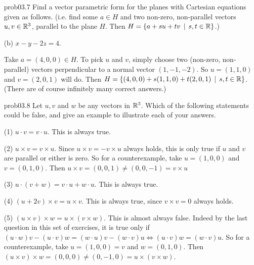  \begin{sol}{prob03.7} Find a vector parametric form  for  the planes with Cartesian equations given as follows. (i.e. find some $a \in H$ and two non-zero, non-parallel vectors $u, v \in \mathbb{R}^3$, parallel to the plane $H$. Then  $H=\{a+ s u + t v\,\mid \, s,t \in \mathbb{R} \}$.)\medskip

(b)  $x - y - 2z = 4$. 

\soln Take $a=(4,0,0) \in H$. To pick $u$ and $v$, simply choose two (non-zero, non-parallel) vectors perpendicular to a normal vector $(1,-1,-2)$. So  $u= (1,1,0)$  and $v=(2,0,1)$ will do. Then $H=\{(4,0,0)+ s (1,1,0) + t (2,0,1)\,\mid \, s,t \in \mathbb{R} \}$. (There are of course infinitely many correct answers.)\medskip


\end{sol} 

\begin{sol}{prob03.8}  Let $u, v$ and $w$ be any vectors in $\mathbb{R}^3$.  Which  of the following statements could be false, and give an example to illustrate each of your answers.
 \medskip

(1)  $u\cdot v=v\cdot u$. \soln This is always true.

\medskip

(2)  $u\times v=v\times u$. \soln Since $u\times v=- v\times u$ always holds, this is only true if $u$ and $v$ are parallel or either is zero. So for a counterexample, take $u=(1,0,0)$ and $v=(0,1,0)$. Then $u\times v=(0,0,1)\not=(0,0,-1)=v \times u$

\medskip

(3)  $u\cdot(v+w)=v\cdot u+w\cdot u$. \soln This is always true. 

\medskip

(4)  $(u+2v)\times v=u\times v$. \soln This is always true, since $v\times v=0$ always holds.

\medskip

(5)  $(u\times v)\times w=u\times(v\times w)$. \soln This is almost always false. Indeed by the last question in this set of exercises, it is true only if $(u \cdot w)v- (u\cdot v) w = (w\cdot u) v- (w\cdot v) u \iff (u\cdot v) w = (w\cdot v) u$. So for a counterexample, take $u=(1,0,0)=v$ and $w=(0,1,0)$. Then $(u\times v)\times w=(0,0,0) \not=(0,-1,0)=u\times(v\times w)$.


\end{sol}


